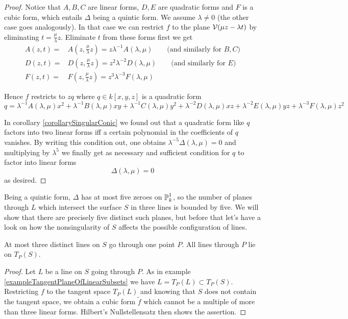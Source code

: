 \begin{proof}
Notice that $A,B,C$ are linear forms, $D,E$ are quadratic forms and $F$ is a cubic form, which entails $\Delta$ being a quintic form.
We assume $\lambda \neq 0$ (the other case goes analogously).
In that case we can restrict $f$ to the plane $\operatorname{\mathcal V}(\mu z - \lambda t)$ by eliminating $t = \frac\mu\lambda z$.
Eliminate $t$ from these forms first we get
\begin{align}
A(z,t) =& A(z,\frac\mu\lambda z) = z\lambda^{-1} A(\lambda,\mu) \qquad \text{(and similarly for $B,C$)} \\
D(z,t) =& D(z,\frac\mu\lambda z) = z^2\lambda^{-2} D(\lambda,\mu) \qquad \text{(and similarly for $E$)} \\
F(z,t) =& F(z,\frac\mu\lambda z) = z^3\lambda^{-3} F(\lambda,\mu)
\end{align}

Hence $f$ restricts to $zq$ where $q \in k[x,y,z]$ is a quadratic form
\begin{equation}
q =
\lambda^{-1} A(\lambda,\mu) x^2
+\lambda^{-1} B(\lambda,\mu) xy
+\lambda^{-1} C(\lambda,\mu) y^2
+\lambda^{-2} D(\lambda,\mu) xz
+\lambda^{-2} E(\lambda,\mu) yz
+\lambda^{-3} F(\lambda,\mu) z^2
\end{equation}

In corollary \ref{corollarySingularConic} we found out that a quadratic form like $q$ factors into two linear forms iff a certain polynomial in the coefficients of $q$ vanishes.
By writing this condition out, one obtains $\lambda^{-5} \Delta(\lambda,\mu) = 0$ and multiplying by $\lambda^5$ we finally get as necessary and sufficient condition for $q$ to factor into linear forms
\begin{equation}
\Delta(\lambda,\mu) = 0
\end{equation}
as desired.
\end{proof}

Being a quintic form, $\Delta$ has at most five zeroes on $\operatorname{\mathbb P}^1_k$, so the number of planes through $L$ which intersect the surface $S$ in three lines is bounded by five.
We will show that there are precisely five distinct such planes, but before that let's have a look on how the nonsingularity of $S$ affects the possible configuration of lines.

\begin{lemma}  \label{lemmaCoplanarLinesOnCubic}
At most three distinct lines on $S$ go through one point $P$.
All lines through $P$ lie on $T_P(S)$.
\end{lemma}
\begin{proof}
Let $L$ be a line on $S$ going through $P$.
As in example \ref{exampleTangentPlaneOfLinearSubsets} we have $L = T_P(L) \subset T_P(S)$.
Restricting $f$ to the tangent space $T_P(L)$ and knowing that $S$ does not contain the tangent space, we obtain a cubic form $\widetilde f$ which cannot be a multiple of more than three linear forms.
Hilbert's Nullstellensatz then shows the assertion.
\end{proof}

